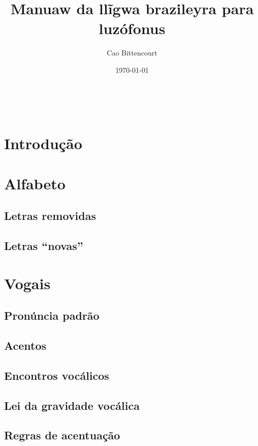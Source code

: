 \documentclass[12pt, a4paper]{article}
\title{Manuaw da llĩgwa brazileyra para luzófonus}
\author{Cao Bittencourt}
\date{\today}
\begin{document}
\maketitle
\thispagestyle{empty}

\newpage \
\thispagestyle{empty}

\newpage
\begin{bilingualpages}
    \rightpage
    \section{Introdução}
    
    \newpage
    \section{Alfabeto}
    \PtTableAbc
    
    \subsection{Letras removidas}
    \subsection{Letras ``novas''}
    
    \section{Vogais}

    \subsection{Pronúncia padrão}
    \subsection{Acentos}
    \subsection{Encontros vocálicos}
    \subsection{Lei da gravidade vocálica}
    \subsection{Regras de acentuação}
    

\end{bilingualpages}
\end{document}
